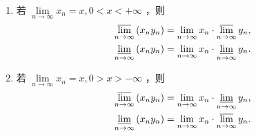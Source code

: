 \begin{proposition}
	\begin{enumerate}
		\item 若 $\lim\limits _{n \rightarrow \infty} x_n=x, 0<x<+\infty$ ，则
		$$
		\begin{aligned}
			& \varlimsup_{n \rightarrow \infty}\left(x_n y_n\right)=\lim _{n \rightarrow \infty} x_n \cdot \varlimsup_{n \rightarrow \infty} y_n, \\
			& \varliminf\limits_{n \rightarrow \infty}\left(x_n y_n\right)=\lim _{n \rightarrow \infty} x_n \cdot \varliminf\limits_{n \rightarrow \infty} y_n .
		\end{aligned}
		$$
		\item 若 $\lim\limits _{n \rightarrow \infty} x_n=x, 0>x>-\infty$ ，则
		$$
		\begin{aligned}
			& \varlimsup_{n \rightarrow \infty}\left(x_n y_n\right)=\lim _{n \rightarrow \infty} x_n \cdot \varliminf_{n \rightarrow \infty} y_n, \\
			& \varliminf\limits_{n \rightarrow \infty}\left(x_n y_n\right)=\lim _{n \rightarrow \infty} x_n \cdot \varlimsup\limits_{n \rightarrow \infty} y_n .
		\end{aligned}
		$$
	\end{enumerate}
	
	
	
	
	
\end{proposition}
